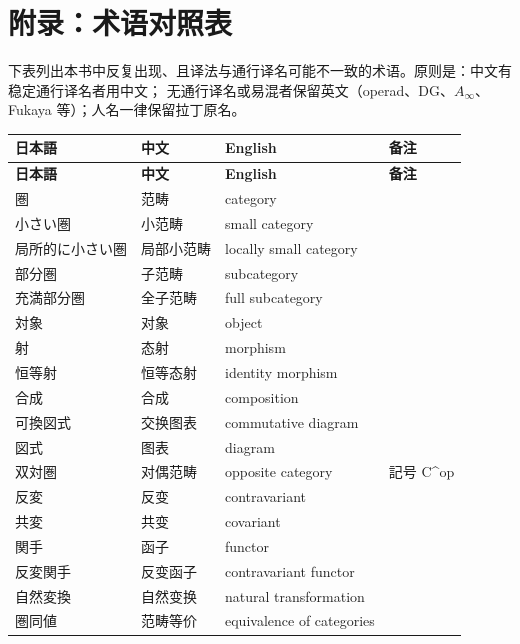 \chapter*{附录：术语对照表}

下表列出本书中反复出现、且译法与通行译名可能不一致的术语。原则是：中文有稳定通行译名者用中文；
无通行译名或易混者保留英文（operad、DG、$A_\infty$、Fukaya 等）；人名一律保留拉丁原名。

\begingroup
\small
\begin{longtable}{p{}p{}p{}p{}}
\toprule
\textbf{日本語} & \textbf{中文} & \textbf{English} & \textbf{备注} \\
\midrule
\endfirsthead
\toprule
\textbf{日本語} & \textbf{中文} & \textbf{English} & \textbf{备注} \\
\midrule
\endhead
\bottomrule
\endfoot
圏 & 范畴 & category &  \\
小さい圏 & 小范畴 & small category &  \\
局所的に小さい圏 & 局部小范畴 & locally small category &  \\
部分圏 & 子范畴 & subcategory &  \\
充満部分圏 & 全子范畴 & full subcategory &  \\
対象 & 对象 & object &  \\
射 & 态射 & morphism &  \\
恒等射 & 恒等态射 & identity morphism &  \\
合成 & 合成 & composition &  \\
可換図式 & 交换图表 & commutative diagram &  \\
図式 & 图表 & diagram &  \\
双対圏 & 对偶范畴 & opposite category & 記号 C\textasciicircum{}op \\
反変 & 反变 & contravariant &  \\
共変 & 共变 & covariant &  \\
関手 & 函子 & functor &  \\
反変関手 & 反变函子 & contravariant functor &  \\
自然変換 & 自然变换 & natural transformation &  \\
圏同値 & 范畴等价 & equivalence of categories &  \\

\end{longtable}
